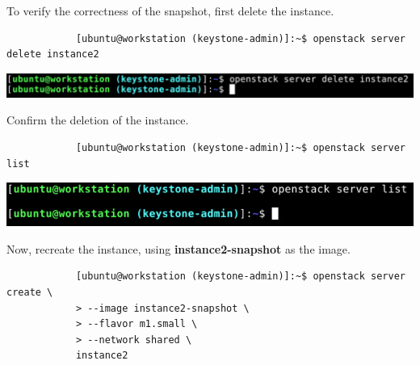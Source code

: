 \documentclass[letterpaper, 12pt]{article}
\begin{document}
\begin{enumerate}
    \begin{labstep}
        To verify the correctness of the snapshot, first delete the instance.
        \begin{lstlisting}
            [ubuntu@workstation (keystone-admin)]:~$ openstack server delete instance2
        \end{lstlisting}

        \begin{center}
            \includegraphics[width=\linewidth]{images/part2/step12.png}
        \end{center}
    \end{labstep}

    \begin{labstep}
        Confirm the deletion of the instance.
        \begin{lstlisting}
            [ubuntu@workstation (keystone-admin)]:~$ openstack server list
        \end{lstlisting}

        \begin{center}
            \includegraphics[width=\linewidth]{images/part2/step13.png}
        \end{center}
    \end{labstep}

    \begin{labstep}
        Now, recreate the instance, using \textbf{instance2-snapshot} as the image.
        \begin{lstlisting}
            [ubuntu@workstation (keystone-admin)]:~$ openstack server create \
            > --image instance2-snapshot \
            > --flavor m1.small \
            > --network shared \
            instance2
        \end{lstlisting}


\end{labstep}
\end{enumerate}
\end{document}
